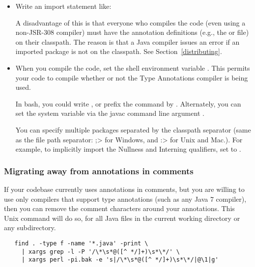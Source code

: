 \begin{itemize}
\item
  Write an import statement like: 

  A disadvantage of this is that everyone who compiles the code
  (even using a non-JSR-308 compiler) must have the annotation definitions
  (e.g., the  or  file) on
  their classpath.  The reason is
  that a Java compiler issues an error if an imported package is not on the
  classpath.  See Section~\ref{distributing}.

\item
  \label{jsr308_imports}
  When you compile the code, set the shell environment variable
  .  This permits your code to compile whether or not
  the Type Annotations compiler is being used.

  In bash, you could write , or prefix the 
  command by  .
  Alternately, you can set the system variable via the javac command line
  argument .

  You can specify multiple packages separated by the classpath separator
  (same as the file path separator:   \<;> for Windows, and \<:> for Unix
  and Mac.).  For example, to
  implicitly import the Nullness and Interning qualifiers,
  set  to
  .  
\end{itemize}


\subsubsection{Migrating away from annotations in comments}

If your codebase currently uses annotations in comments, but you are
willing to use only compilers that support type annotations (such as any
Java 7 compiler), then you can remove the comment characters around your
annotations.  This Unix command will do so, for all Java files in the
current working directory or any subdirectory.

\begin{Verbatim}
   find . -type f -name '*.java' -print \
     | xargs grep -l -P '/\*\s*@([^ */]+)\s*\*/' \
     | xargs perl -pi.bak -e 's|/\*\s*@([^ */]+)\s*\*/|@\1|g'
\end{Verbatim}

